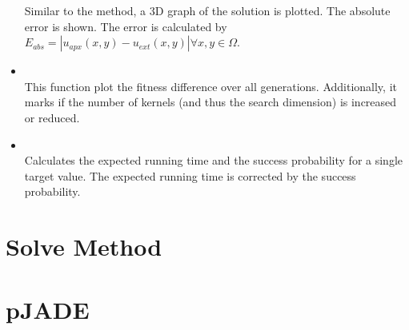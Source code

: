 \documentclass[.\jobname.tex]{subfiles}
\begin{document}
\begin{itemize}
	Similar to the 	 method, a 3D graph of the solution is plotted. The absolute error is shown. The error is calculated by $E_{abs}  = \left| u_{apx}(x,y) - u_{ext}(x,y) \right| \forall x,y \in \Omega$. 
	\item {} \\
	This function plot the fitness difference over all generations. Additionally, it marks if the number of kernels (and thus the search dimension) is increased or reduced. 
	\item {} \\
	Calculates the expected running time and the success probability for a single target value. The expected running time is corrected by the success probability. 
\end{itemize}



\chapter{Solve Method}
\label{chap:solve_function}

\begin{algorithm}[H]
	\SetAlgoNoLine
	\DontPrintSemicolon
	\label{algo: solve}
\end{algorithm}



\chapter{pJADE}
\label{chap:pseudocode_pjade}
\end{document}
